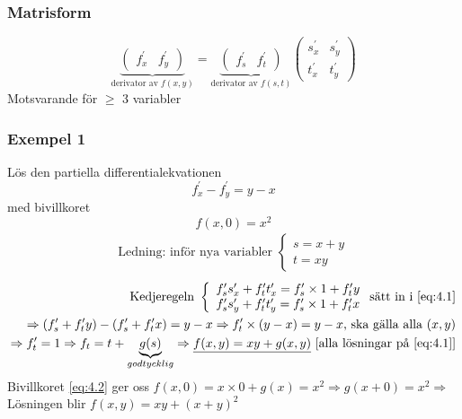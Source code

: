 \documentclass{article}
\begin{document}
\begin{enumerate}
	\subsubsection*{Matrisform}
	\[
	\underbrace{\begin{pmatrix} f_{x}^{\prime} & f_{y}^{\prime} \end{pmatrix}}_{\text{derivator av }f(x,y)} =
	\underbrace{\begin{pmatrix} f_{s}^{\prime} & f_{t}^{\prime} \end{pmatrix}}_{\text{derivator av }f(s,t)}
	\begin{pmatrix} s_{x}^{\prime} & s_{y}^{\prime} \\ t_{x}^{\prime} & t_{y}^{\prime} \end{pmatrix}
	\]
	Motsvarande för \(\geq\) 3 variabler
\end{enumerate}

\newpage
\subsubsection{Exempel 1} Lös den partiella differentialekvationen
\begin{equation} \label{eq:4.1}
	f_{x}^{\prime} - f_{y}^{\prime} = y-x
\end{equation}
med bivillkoret 
\begin{equation}\label{eq:4.2}
	f(x,0) = x^2
\end{equation}
\[
\begin{split}
	\text{Ledning: inför nya variabler } \left\{\begin{array}{rcl}
	s = x+y \\ t = xy
	\end{array}\right.
\end{split}
\]
\[
\begin{split}
	\text{Kedjeregeln } \left\{\begin{array}{rcl}
		f_{s}^{\prime}s_{x}^{\prime} + f_{t}^{\prime}t_{x}^{\prime} = 
		f_{s}^{\prime}\times1 + f_{t}^{\prime}y \\
		f_{s}^{\prime}s_{y}^{\prime} + f_{t}^{\prime}t_{y}^{\prime} =
		f_{s}^{\prime}\times1 + f_{t}^{\prime}x
	\end{array}\right.
	\text{sätt in i \eqref{eq:4.1}} \\
	\Rightarrow (f_{s}^{\prime}+f_{t}^{\prime}y) - (f_{s}^{\prime}+f_{t}^{\prime}x) = y-x
	\Rightarrow f_{t}^{\prime}\times(y-x) = y-x \text{, ska gälla alla } (x,y) \\
	\Rightarrow f_{t}^{\prime} = 1 \Rightarrow f_{t} = t + \underbrace{g(s)}_{godtycklig}
	\Rightarrow \underline{f(x,y) = xy + g(x,y)} \text{ [alla lösningar på \eqref{eq:4.1}]}
\end{split}
\]
Bivillkoret \eqref{eq:4.2} ger oss \(f(x,0) = x \times 0 + g(x) = x^2 \Rightarrow g(x+0) = x^2 \Rightarrow\)
Lösningen blir \(f(x,y) = xy + (x+y)^2\)
\end{document}
